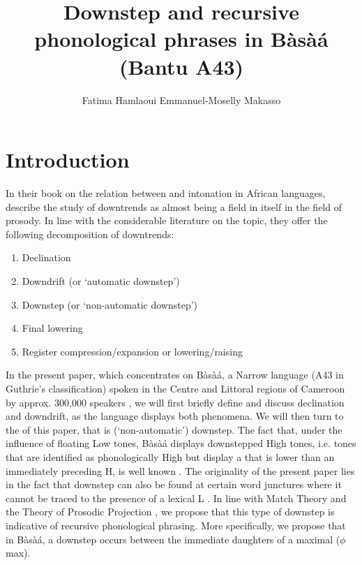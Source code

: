 \documentclass[output=paper,newtxmath,modfonts,nonflat]{langsci/langscibook}
\title{Downstep and recursive phonological phrases in Bàsà{á} (Bantu A43)}
\author{Fatima Hamlaoui\affiliation{ZAS, Berlin; University of Toronto} \lastand Emmanuel-Moselly Makasso\affiliation{ZAS, Berlin}}
\begin{document}
\maketitle


\section{Introduction}\label{sec:HamlaouiMakasso:1} 

In their book on the relation between  and intonation in African languages, \citet{DowningRialland16} describe the study of downtrends as almost being a field in itself in the field of prosody. In line with the considerable literature on the topic, they offer the following decomposition of downtrends:

\begin{enumerate}
\item Declination
\item Downdrift (or `automatic downstep')
\item Downstep (or `non-automatic downstep')
\item Final lowering
\item Register compression/expansion or  lowering/raising
\end{enumerate}

\noindent In the present paper, which concentrates on Bàsà{á}, a Narrow  language (A43 in Guthrie's classification) spoken in the Centre and Littoral regions of Cameroon by approx. 300,000 speakers \citep{SIL}, we will first briefly define and discuss declination and downdrift, as the language displays both phenomena. We will then turn to the  of this paper, that is (`non-automatic') downstep. The fact that,  under the influence of floating Low tones,  Bàsà{á} displays downstepped High tones, i.e. tones that are identified as phonologically High but display a  that is lower than an immediately preceding H, is well known \citep[a.o.][]{Dimmendaal88,Kody93,Hyman03,HamlaouiEtAl14}. The originality of the present paper lies in the fact that downstep can also be found at certain word junctures where it cannot be traced to the presence of a lexical L . In line with Match Theory \citep{Selkirk09, Selkirk11} and the Theory of Prosodic Projection \citep[a.o.][]{ItoMester12}, we propose that this type of downstep is indicative of recursive phonological phrasing. More specifically, we propose that in Bàsà{á}, a downstep occurs between the immediate daughters of a maximal  ($\phi$max).
\nocite{Guthrie48}
\end{document}
